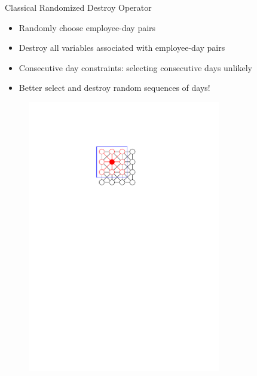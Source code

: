 \documentclass[aspectratio=1610]{beamer}
\newcommand{\important}[1]{{\color{green!60!black}#1}}
\begin{document}
\begin{frame}{Classical Randomized Destroy Operator}
	\begin{itemize}
		\item<1-2> \important{Randomly} choose employee-day pairs
		\item<1-2> Destroy all variables associated with \important{employee-day pairs}
		\item<3-> \important{Consecutive day constraints}: selecting consecutive days unlikely
		\item<3-> Better select and destroy \important{random sequences} of days!
	\end{itemize}
	\begin{figure}
		\begin{overprint}
			\centering\includegraphics[width=0.75\textwidth, page=13]{graphics/graphics.pdf}

\end{overprint}
\end{figure}
\end{frame}
\end{document}
